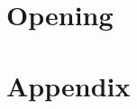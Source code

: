 \part{Opening}


\cleardoublepage


























\cleardoublepage





\part{Appendix} %






